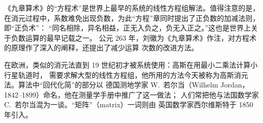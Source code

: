 \begin{history}
《九章算术》的“方程术”是世界上最早的系统的线性方程组解法\parencite{guo2009}。值得注意的是，
在消元过程中，系数难免出现负数，为此“方程”章同时提出了正负数的加减法则，即“正负术”：
“同名相除，异名相益，正无入负之，负无入正之。”这也是世界上关于负数运算的最早记载之一。
公元 263 年，刘徽为《九章算术》作注，对方程术的原理作了深入的阐释，还提出了减少运算
次数的改进方法。

在欧洲，类似的消元法直到 19 世纪初才被系统使用：高斯在用最小二乘法计算小行星轨道时，
需要求解大型的线性方程组，他所用的方法今天被称为高斯消元法。算法中“回代化简”的部分以
德国测地学家 W.~若尔当（Wilhelm Jordan，1842--1899）命名，他在测量学手册中推广了这一做法；
人们常把他与法国数学家 C.~若尔当混为一谈\parencite{althoen1987}。“矩阵”（matrix）一词则由
英国数学家西尔维斯特于 1850 年引入。
\end{history}
